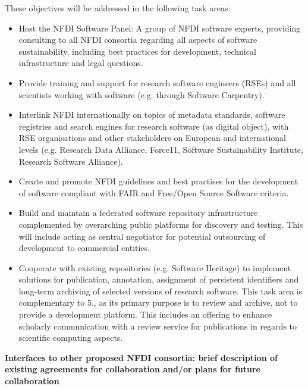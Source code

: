 \documentclass[11pt,a4paper,DIV=11]{scrlttr2}
\begin{document}
\begin{letter}{}
These objectives will be addressed in the following task areas:
\begin{itemize}
 \item Host the NFDI Software Panel: A group of NFDI software experts, providing consulting to all NFDI consortia regarding all aspects of software sustainability, including best practices for development, technical infrastructure and legal questions.
 \item Provide training and support for research software engineers (RSEs) and all scientists  working with software (e.g. through Software Carpentry).
 \item Interlink NFDI internationally on topics of metadata standards, software registries and search engines for research software (as digital object), with RSE organisations and other stakeholders on European and international levels (e.g. Research Data Alliance, Force11, Software Sustainability Institute, Research Software Alliance).
 \item Create and promote NFDI guidelines and best practises for the development of software compliant with FAIR and Free/Open Source Software criteria.
 \item Build and maintain a federated software repository infrastructure complemented by overarching public platforms for discovery and testing. This will include acting as central negotiator for potential outsourcing of development to commercial entities.
 \item Cooperate with existing repositories (e.g. Software Heritage) to implement solutions for publication, annotation, assignment of persistent identifiers and long-term archiving of selected versions of research software. This task area is complementary to 5., as its primary purpose is to review and archive, not to provide a development platform. This includes an offering to enhance scholarly communication with a review service for publications in regards to scientific computing aspects.
\end{itemize}

\clearpage
\textbf{Interfaces to other proposed NFDI consortia: brief description of existing agreements for collaboration and/or plans for future collaboration}\\


\end{letter}
\end{document}
